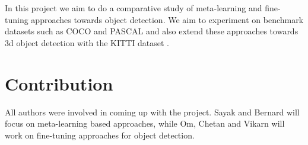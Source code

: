 \documentclass{article}
\begin{document}
In this project we aim to do a comparative study of meta-learning and fine-tuning approaches towards object detection. We aim to experiment on benchmark datasets such as COCO \cite{LinMBHPRDZ14} and PASCAL\cite{Everingham10} and also extend these approaches towards 3d object detection with the KITTI dataset \cite{Geiger2013IJRR}.

\section{Contribution}
All authors were involved in coming up with the project. Sayak and Bernard will focus on meta-learning based approaches, while Om, Chetan and Vikarn will work on fine-tuning approaches for object detection. 



\end{document}
